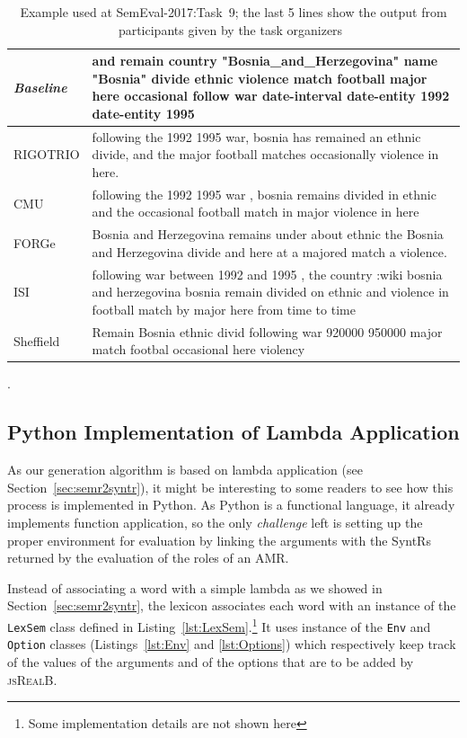 \documentclass[12pt]{article}
\newcommand{\systeme}[1]{\textsc{#1}}
\newcommand{\jsr}{\systeme{jsRealB}}
\newcommand{\representation}[1]{\textsf{#1}}
\newcommand{\AMR}{\representation{AMR}}
\newcommand{\SYNTR}{\representation{SyntR}}
\begin{document}
\begin{table}[ht]
\begin{tabular}{|p{1in}|p{5.25in}|}
\emph{Baseline}&and remain country "Bosnia\_and\_Herzegovina" name "Bosnia" divide ethnic violence match football major here occasional follow war date-interval date-entity 1992 date-entity 1995
\\\hline\hline
RIGOTRIO&following the 1992 1995 war, bosnia has remained an ethnic divide, and the major football matches occasionally violence in here.\\\hline
CMU&following the 1992 1995 war , bosnia remains divided in ethnic and the occasional football match in major violence in here\\\hline
FORGe&Bosnia and Herzegovina remains under about ethnic the Bosnia and Herzegovina divide and here at a majored match a violence.\\\hline
ISI&following war between 1992 and 1995 , the country :wiki bosnia and herzegovina bosnia remain divided on ethnic and violence in football match by major here from time to time\\\hline
Sheffield&Remain Bosnia ethnic divid following war 920000 950000 major match footbal occasional here violency\\\hline
\end{tabular}
\caption{Example used at SemEval-2017:Task~9; the last 5 lines show the output from participants given by the task organizers~\cite{SemEval2017-T9-Desc}}.
\label{ex:semeval2017}
\end{table}

\clearpage
\subsection{Python Implementation of Lambda Application} %
\label{sub:python_implementation_of_lambda_application}

%
As our generation algorithm is based on lambda application (see Section~\ref{sec:semr2syntr}), it might be interesting to some readers to see how this process is implemented in Python. As Python is a functional language, it already implements function application, so the only \emph{challenge} left is setting up the proper environment for evaluation by linking the arguments with the \SYNTR{}s returned by the evaluation of the roles of an \AMR{}.

Instead of associating a word with a simple lambda as we showed in Section~\ref{sec:semr2syntr}, the lexicon associates each word with an instance of the \lstinline{LexSem} class defined in Listing~\ref{lst:LexSem}.\footnote{Some implementation details are not shown here} It uses instance of the \lstinline{Env} and \lstinline{Option} classes (Listings~\ref{lst:Env} and \ref{lst:Options}) which respectively keep track of the values of the arguments and of the options that are to be added by \jsr{}.
\end{document}
